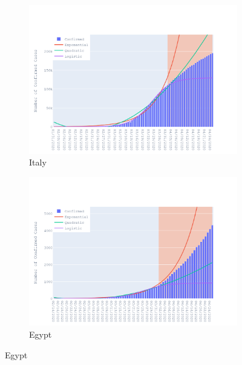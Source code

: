 \documentclass{homework}
\begin{document}
\begin{figure}[H]
  \begin{subfigure}{0.45\linewidth}
    \includegraphics[width=\linewidth]{task1/Italy.png}
    \caption{Italy}
  \end{subfigure}
  \hfil
  \begin{subfigure}{0.45\linewidth}
    \includegraphics[width=\linewidth]{task1/Egypt.png}
    \caption{Egypt}
  \end{subfigure}


\end{figure}
\end{document}
